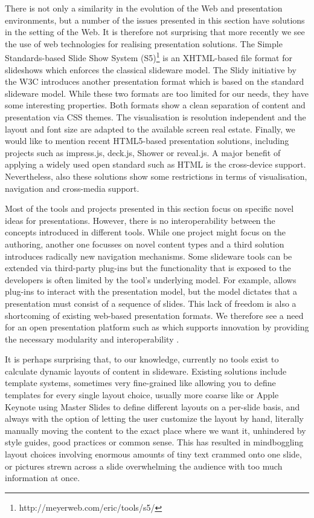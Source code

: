    There is not only a similarity in the evolution of the Web and presentation
   environments, but a number of the issues presented in this section have
   solutions in the setting of the Web. It is therefore not surprising that
   more recently we see the use of web technologies for realising presentation
   solutions. The Simple Standards-based Slide Show System
   (S5)\footnote{http://meyerweb.com/eric/tools/s5/} is an XHTML-based file
   format for slideshows which enforces the classical slideware model. The
   Slidy \citep{raggett-1} initiative by the W3C introduces another
   presentation format which is based on the standard slideware model. While
   these two formats are too limited for our needs, they have some interesting
   properties. Both formats show a clean separation of content and presentation
   via CSS themes. The visualisation is resolution independent and the layout
   and font size are adapted to the available screen real estate. Finally, we
   would like to mention recent HTML5-based presentation solutions, including
   projects such as impress.js, deck.js, Shower or reveal.js. A major benefit
   of applying a widely used open standard such as HTML is the cross-device
   support. Nevertheless, also these solutions show some restrictions in terms
   of visualisation, navigation and cross-media support.

   Most of the tools and projects presented in this section focus on specific
   novel ideas for presentations. However, there is no interoperability between
   the concepts introduced in different tools. While one project might focus on
   the authoring, another one focusses on novel content types and a third
   solution introduces radically new navigation mechanisms. Some slideware
   tools can be extended via third-party plug-ins but the functionality that is
   exposed to the developers is often limited by the tool's underlying model.
   For example, \ppt allows plug-ins to interact with the presentation model,
   but the model dictates that a presentation must consist of a sequence of
   slides. This lack of freedom is also a shortcoming of existing web-based
   presentation formats. We therefore see a need for an open presentation
   platform such as \mxp which supports innovation by providing the necessary
   modularity and interoperability \citep{bush-1}.

   It is perhaps surprising that, to our knowledge, currently no tools exist to
   calculate dynamic layouts of content in slideware. Existing solutions
   include template systems, sometimes very fine-grained like \latex allowing
   you to define templates for every single layout choice, usually more coarse
   like \ppt* or Apple Keynote using Master Slides to define different layouts
   on a per-slide basis, and always with the option of letting the user
   customize the layout by hand, literally manually moving the content to the
   exact place where we want it, unhindered by style guides, good practices or
   common sense. This has resulted in mindboggling layout choices involving
   enormous amounts of tiny text crammed onto one slide, or pictures strewn
   across a slide overwhelming the audience with too much information at once. 

